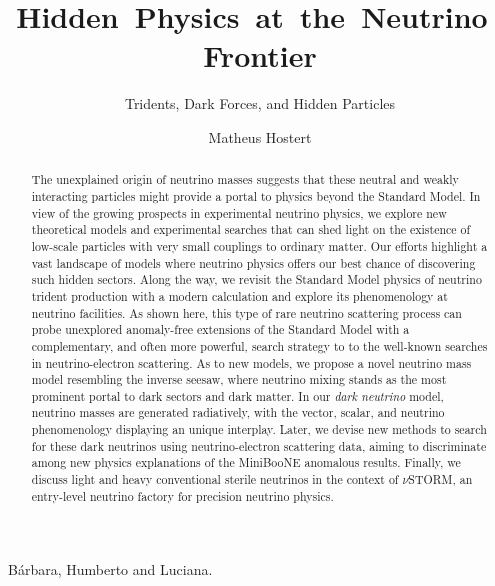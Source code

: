 \documentclass[openany,twoside,frontopenright,openright]{ip3thesis}
\begin{document}
\title{Hidden~Physics~at~the~Neutrino~Frontier}
\subtitle{Tridents, Dark Forces, and Hidden Particles}
\author{Matheus Hostert}
\maketitlepage*


\begin{abstract}
%
The unexplained origin of neutrino masses suggests that these neutral and weakly interacting particles might provide a portal to physics beyond the Standard Model. In view of the growing prospects in experimental neutrino physics, we explore new theoretical models and experimental searches that can shed light on the existence of low-scale particles with very small couplings to ordinary matter. Our efforts highlight a vast landscape of models where neutrino physics offers our best chance of discovering such hidden sectors. Along the way, we revisit the Standard Model physics of neutrino trident production with a modern calculation and explore its phenomenology at neutrino facilities. As shown here, this type of rare neutrino scattering process can probe unexplored anomaly-free extensions of the Standard Model with a complementary, and often more powerful, search strategy to to the well-known searches in neutrino-electron scattering. As to new models, we propose a novel neutrino mass model resembling the inverse seesaw, where neutrino mixing stands as the most prominent portal to dark sectors and dark matter. In our \emph{dark neutrino} model, neutrino masses are generated radiatively, with the vector, scalar, and neutrino phenomenology displaying an unique interplay. Later, we devise new methods to search for these dark neutrinos using neutrino-electron scattering data, aiming to discriminate among new physics explanations of the MiniBooNE anomalous results. Finally, we discuss light and heavy conventional sterile neutrinos in the context of $\nu$STORM, an entry-level neutrino factory for precision neutrino physics.
%
\end{abstract}


\begin{dedication*}
%
B\'arbara, Humberto and Luciana.
%
\end{dedication*}

\disableprotrusion
\tableofcontents*
\listoffigures
\enableprotrusion
\end{document}
